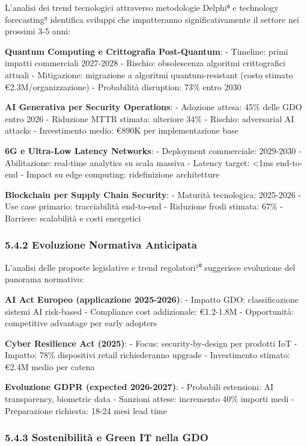 \documentclass[12pt,a4paper,oneside]{book}
\begin{document}
L'analisi dei trend tecnologici attraverso metodologie Delphi⁸ e
technology forecasting⁹ identifica sviluppi che impatteranno
significativamente il settore nei prossimi 3-5 anni:

\textbf{Quantum Computing e Crittografia Post-Quantum}: - Timeline:
primi impatti commerciali 2027-2028 - Rischio: obsolescenza algoritmi
crittografici attuali - Mitigazione: migrazione a algoritmi
quantum-resistant (costo stimato €2.3M/organizzazione) - Probabilità
disruption: 73\% entro 2030

\textbf{AI Generativa per Security Operations}: - Adozione attesa: 45\%
delle GDO entro 2026 - Riduzione MTTR stimata: ulteriore 34\% - Rischio:
adversarial AI attacks - Investimento medio: €890K per implementazione
base

\textbf{6G e Ultra-Low Latency Networks}: - Deployment commerciale:
2029-2030 - Abilitazione: real-time analytics su scala massiva - Latency
target: \textless1ms end-to-end - Impact su edge computing:
ridefinizione architetture

\textbf{Blockchain per Supply Chain Security}: - Maturità tecnologica:
2025-2026 - Use case primario: tracciabilità end-to-end - Riduzione
frodi stimata: 67\% - Barriere: scalabilità e costi energetici

\subsubsection{5.4.2 Evoluzione Normativa
Anticipata}\label{evoluzione-normativa-anticipata}

L'analisi delle proposte legislative e trend regolatori¹⁰ suggerisce
evoluzione del panorama normativo:

\textbf{AI Act Europeo (applicazione 2025-2026)}: - Impatto GDO:
classificazione sistemi AI risk-based - Compliance cost addizionale:
€1.2-1.8M - Opportunità: competitive advantage per early adopters

\textbf{Cyber Resilience Act (2025)}: - Focus: security-by-design per
prodotti IoT - Impatto: 78\% dispositivi retail richiederanno upgrade -
Investimento stimato: €2.4M medio per catena

\textbf{Evoluzione GDPR (expected 2026-2027)}: - Probabili estensioni:
AI transparency, biometric data - Sanzioni attese: incremento 40\%
importi medi - Preparazione richiesta: 18-24 mesi lead time

\subsubsection{5.4.3 Sostenibilità e Green IT nella
GDO}\label{sostenibilituxe0-e-green-it-nella-gdo}
\end{document}
